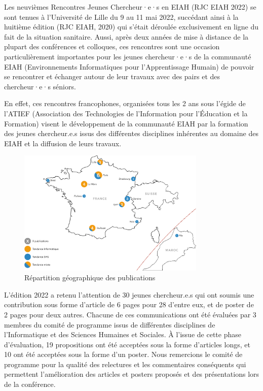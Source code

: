 Les neuvièmes Rencontres Jeunes Chercheur·e·s en EIAH (RJC EIAH 2022) se sont tenues à l’Université de Lille du 9 au 11 mai 2022, succédant ainsi à la huitième édition (RJC EIAH, 2020) qui s’était déroulée exclusivement en ligne du fait de la situation sanitaire.  
Aussi, après deux années de mise à distance de la plupart des conférences et colloques, ces rencontres sont une occasion particulièrement importantes pour les jeunes chercheur·e·s de la communauté EIAH (Environnements Informatiques pour l’Apprentissage Humain) de pouvoir se rencontrer et échanger autour de leur travaux avec des pairs et des chercheur·e·s séniors. 

En effet, ces rencontres francophones, organisées tous les 2 ans sous l’égide de l’ATIEF (Association des Technologies de l'Information pour l'Éducation et la Formation) visent le développement de la communauté EIAH par la formation des jeunes chercheur.e.s issus des différentes disciplines inhérentes au domaine des EIAH et la diffusion de leurs travaux. 

\begin{figure}[!ht]
	\centering
	\includegraphics[width=0.8\textwidth]{Content/figures/carteComplete.png}
	\caption{Répartition géographique des publications}
	\label{f:repGeoPubli}
\end{figure}

L’édition 2022 a retenu l’attention de 30 jeunes chercheur.e.s qui ont soumis une contribution sous forme d’article de 6 pages pour 28 d’entre eux, et de poster de 2 pages pour deux autres. 
Chacune de ces communications ont été évaluées par 3 membres du comité de programme issus de différentes disciplines de l’Informatique et des Sciences Humaines et Sociales. À l’issue de cette phase d'évaluation, 19 propositions ont été acceptées sous la forme d’articles longs, et 10 ont été acceptées sous la forme d’un poster.  
Nous remercions le comité de programme pour la qualité  des relectures et les commentaires conséquents qui permettent l’amélioration des articles et posters proposés et des présentations lors de la conférence.

